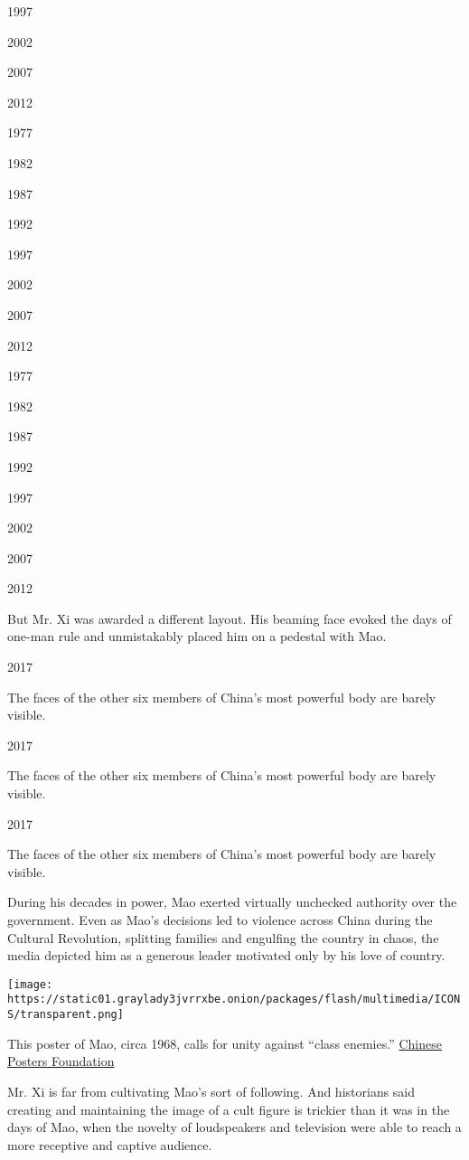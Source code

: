 1997

2002

2007

2012

1977

1982

1987

1992

1997

2002

2007

2012

1977

1982

1987

1992

1997

2002

2007

2012

But Mr. Xi was awarded a different layout. His beaming face evoked the
days of one-man rule and unmistakably placed him on a pedestal with Mao.

2017

The faces of the other six members of China's most powerful body are
barely visible.

2017

The faces of the other six members of China's most powerful body are
barely visible.

2017

The faces of the other six members of China's most powerful body are
barely visible.

During his decades in power, Mao exerted virtually unchecked authority
over the government. Even as Mao's decisions led to violence across
China during the Cultural Revolution, splitting families and engulfing
the country in chaos, the media depicted him as a generous leader
motivated only by his love of country.

\texttt{[image: https://static01.graylady3jvrrxbe.onion/packages/flash/multimedia/ICONS/transparent.png]}

This poster of Mao, circa 1968, calls for unity against ``class
enemies.'' \href{https://chineseposters.net/}{Chinese Posters
Foundation}

Mr. Xi is far from cultivating Mao's sort of following. And historians
said creating and maintaining the image of a cult figure is trickier
than it was in the days of Mao, when the novelty of loudspeakers and
television were able to reach a more receptive and captive audience.

